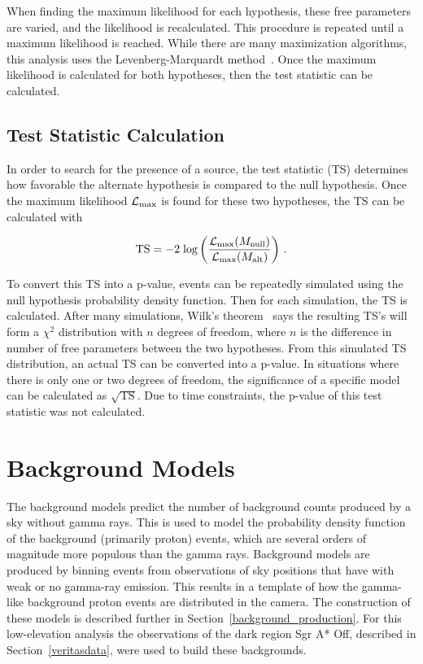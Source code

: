 When finding the maximum likelihood for each hypothesis, these free parameters are varied, and the likelihood is recalculated.
This procedure is repeated until a maximum likelihood is reached.
While there are many maximization algorithms, this analysis uses the Levenberg-Marquardt method~\cite{marquardt1963algorithm}.
Once the maximum likelihood is calculated for both hypotheses, then the test statistic can be calculated.

\subsection{Test Statistic Calculation}

In order to search for the presence of a source, the test statistic (TS) determines how favorable the alternate hypothesis is compared to the null hypothesis.
Once the maximum likelihood $\mathcal{L}_{\textrm{max}}$ is found for these two hypotheses, the TS can be calculated with

\begin{equation}\label{eqn:tscalc}
  \textrm{TS} = - 2 \; \textrm{log} \left (  \frac{ \mathcal{L}_{\textrm{max}}( M_\textrm{null} ) }{ \mathcal{L}_{\textrm{max}}( M_\textrm{alt} ) } \right ) \,.
\end{equation}

To convert this TS into a p-value, events can be repeatedly simulated using the null hypothesis probability density function.
Then for each simulation, the TS is calculated.
After many simulations, Wilk's theorem~\cite{wilks1938} says the resulting TS's will form a $\chi^2$ distribution with $n$ degrees of freedom, where $n$ is the difference in number of free parameters between the two hypotheses.
From this simulated TS distribution, an actual TS can be converted into a p-value.
In situations where there is only one or two degrees of freedom, the significance of a specific model can be calculated as $\sqrt{\textrm{TS}}$.
Due to time constraints, the p-value of this test statistic was not calculated.


\section{Background Models}\label{sec:bkgmodels}
The background models predict the number of background counts produced by a sky without gamma rays.
This is used to model the probability density function of the background (primarily proton) events, which are several orders of magnitude more populous than the gamma rays.
Background models are produced by binning events from observations of sky positions that have with weak or no gamma-ray emission.
This results in a template of how the gamma-like background proton events are distributed in the camera.
The construction of these models is described further in Section~\ref{background_production}.
For this low-elevation analysis the observations of the dark region Sgr A* Off, described in Section~\ref{veritasdata}, were used to build these backgrounds.

